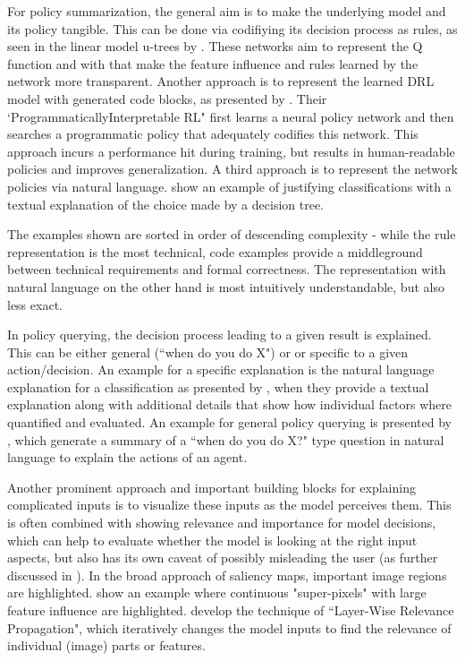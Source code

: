 \documentclass[twoside,11pt]{article}
\begin{document}
For policy summarization, the general aim is to make the underlying model and its policy tangible. This can be done via codifiying its decision process as rules, as seen in the linear model u-trees by \citet{LiuEtAl:2018:LinearModelUTrees}. These networks aim to represent the Q function and with that make the feature influence and rules learned by the network more transparent. 
Another approach is to represent the learned DRL model with generated code blocks, as presented by \citet{VermaEtAl:2018:ProgrammaticallyInterpretableRL}. Their `ProgrammaticallyInterpretable RL" first learns a neural policy network and then searches a programmatic policy that adequately codifies this network. This approach incurs a performance hit during training, but results in human-readable policies and improves generalization.
A third approach is to represent the network policies via natural language. \citet{AlonsoEtAl:2018:xAINLBeerClassifier} show an example of justifying classifications with a textual explanation of the choice made by a decision tree. 

The examples shown are sorted in order of descending complexity - while the rule representation is the most technical, code examples provide a middleground between technical requirements and formal correctness. The representation with natural language on the other hand is most intuitively understandable, but also less exact.

In policy querying, the decision process leading to a given result is explained. This can be either general (``when do you do X") or or specific to a given action/decision.
An example for a specific explanation is the natural language explanation for a classification as presented by \citet{AlonsoEtAl:2018:xAINLBeerClassifier}, when they provide a textual explanation along with additional details that show how individual factors where quantified and evaluated.
An example for general policy querying is presented by \citet{HayesShah:2017:AutonomousPolicyExplanation}, which generate a summary of a ``when do you do X?" type question in natural language to explain the actions of an agent.


Another prominent approach and important building blocks for explaining complicated inputs is to visualize these inputs as the model perceives them. This is often combined with showing relevance and importance for model decisions, which can help to evaluate whether the model is looking at the right input aspects, but also has its own caveat of possibly misleading the user (as further discussed in \citet{EvansEtAl:2021:ExplainabilityParadox}).
In the broad approach of saliency maps, important image regions are highlighted. \citet{LiuEtAl:2018:LinearModelUTrees} show an example where continuous "super-pixels" with large feature influence are highlighted. \citet{Bach:2015:LayerWiseRelevancePropagation} develop the technique of ``Layer-Wise Relevance Propagation", which iteratively changes the model inputs to find the relevance of individual (image) parts or features.
\end{document}
